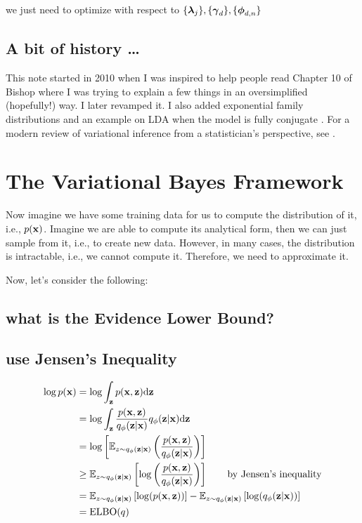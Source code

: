\documentclass{article}
\begin{document}
we just need to optimize with respect to $\{  \boldsymbol{\lambda}_j \}, \{ \boldsymbol{\gamma}_d \}, \{  \boldsymbol{\phi}_{d,n} \} $

\subsection{A bit of history \dots}

This note started in 2010 when I was inspired to help people read Chapter 10 of Bishop \cite{bishop2006pattern} where I was trying to explain a few things in an oversimplified (hopefully!) way. I later revamped it. I also added exponential family distributions and an example on LDA when the model is fully conjugate \cite{hoffman2013stochastic}. For a modern review of variational inference from a statistician's perspective, see \cite{blei2017variational}.

\section{The Variational Bayes Framework}

Now imagine we have some training data for us to compute the distribution of it, i.e., $p({\mathbf x})$. Imagine we are able to compute its analytical form, then we can just sample from it, i.e., to create new data. However, in many cases, the distribution is intractable, i.e., we cannot compute it. Therefore, we need to approximate it.

Now, let's consider the following:

\subsection{what is the Evidence Lower Bound?}

\subsection{use Jensen's Inequality}


\begin{equation}\begin{split}
\log  p({\mathbf x}) &= \log \int_{{\mathbf z}}  p({\mathbf x},{\mathbf z})\text{d} {\mathbf z} \\
&= \log \int_{{\mathbf z}} \frac{ p({\mathbf x},{\mathbf z})}{q_{\phi}({\mathbf z}|{\mathbf x})} q_{\phi}({\mathbf z}|{\mathbf x}) \text{d} {\mathbf z}\\
&= \log \left[ \mathbb{E}_{z \sim q_{\phi}({\mathbf z}|{\mathbf x})} \left(\frac{ p({\mathbf x},{\mathbf z})}{q_{\phi}({\mathbf z}|{\mathbf x})} \right) \right]\\
&\ge \mathbb{E}_{z \sim q_{\phi}({\mathbf z}|{\mathbf x})} \left[ \log  \left( \frac{ p({\mathbf x},{\mathbf z})}{q_{\phi}({\mathbf z}|{\mathbf x})} \right) \right]\quad\quad\text{by Jensen's inequality}\\
&= \mathbb{E}_{z \sim q_{\phi}({\mathbf z}|{\mathbf x})} \left[ \log (  p({\mathbf x},{\mathbf z}) ) \right]  -
\mathbb{E}_{z \sim q_{\phi}({\mathbf z}|{\mathbf x})} \left[ \log ( q_{\phi}({\mathbf z}|{\mathbf x}) ) \right]\\
&= \text{ELBO}(q)\\
\end{split}\end{equation}
\end{document}
